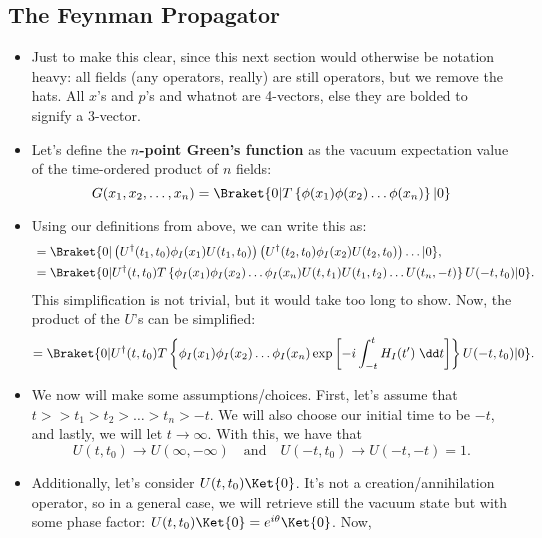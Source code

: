 \subsection*{The Feynman Propagator}

\begin{itemize}
    \item[] Just to make this clear, since this next section would otherwise be notation heavy: all fields (any operators, really) are still operators, but we remove the hats. All $x$'s and $p$'s and whatnot are 4-vectors, else they are bolded to signify a 3-vector.
    \item Let's define the \textbf{$n$-point Green's function} as the vacuum expectation value of the time-ordered product of $n$ fields:
        \begin{equation}
            G(x_1,x_2,\ldots,x_n) = \Braket{0 | T\left\{ \phi(x_1)\phi(x_2) \ldots \phi(x_n) \right\} | 0}\label{eq:NPointGreensFunc}
        \end{equation}
    \item Using our definitions from above, we can write this as:
        \begin{align*}
            &= \Braket{0 | \left( U^{\dagger}(t_1,t_0)\phi_I(x_1)U(t_1,t_0) \right)\left( U^{\dagger}(t_2,t_0)\phi_I(x_2)U(t_2,t_0) \right)\ldots | 0}, \\
            &= \Braket{0 | U^{\dagger}(t,t_0) T\left\{ \phi_I(x_1)\phi_I(x_2) \ldots \phi_I(x_n) U(t,t_1)U(t_1,t_2) \ldots U(t_n,-t) \right\} U(-t,t_0) | 0}.
        \end{align*}
        This simplification is not trivial, but it would take too long to show. Now, the product of the $U$'s can be simplified:
        \begin{equation*}
            =\Braket{0 | U^{\dagger}(t,t_0) T\left\{ \phi_I(x_1)\phi_I(x_2) \ldots \phi_I(x_n) \exp\left[ -i \int_{-t}^t H_I(t')\;\dd t \right] \right\} U(-t,t_0) | 0}.
        \end{equation*}
    \item We now will make some assumptions/choices. First, let's assume that $t >> t_1 > t_2 > \ldots > t_n > -t$. We will also choose our initial time to be $-t$, and lastly, we will let $t \rightarrow \infty$. With this, we have that
        \begin{equation*}
            U(t,t_0) \rightarrow U(\infty,-\infty) \quad \mathrm{and} \quad U(-t,t_0) \rightarrow U(-t,-t) = 1.
        \end{equation*}
    \item Additionally, let's consider $U(t,t_0)\Ket{0}$. It's not a creation/annihilation operator, so in a general case, we will retrieve still the vacuum state but with some phase factor: $U(t,t_0)\Ket{0} = e^{i\theta}\Ket{0}$. Now,

\end{itemize}
